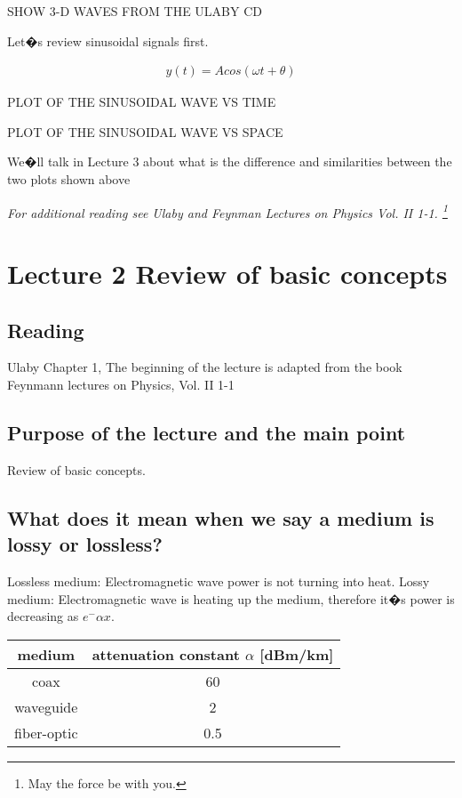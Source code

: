 SHOW 3-D WAVES FROM THE ULABY CD

Let�s review sinusoidal signals first.

\begin{eqnarray}
y(t)= A cos(\omega t + \theta)
\end{eqnarray}

PLOT OF THE SINUSOIDAL WAVE VS TIME


PLOT OF THE SINUSOIDAL WAVE VS SPACE


We�ll talk in Lecture 3 about what is the difference and similarities between the two plots shown above




{\it For additional reading see Ulaby and Feynman Lectures on Physics Vol. II 1-1. \footnote{May the force be with you.}}

\newpage

\section{Lecture 2 Review of basic concepts}


\subsection{Reading}
Ulaby Chapter 1, The beginning of the lecture is adapted from the book Feynmann lectures on Physics, Vol. II 1-1

\subsection{Purpose of the lecture and the main point}

Review of basic concepts.


\subsection{What does it mean when we say a medium is lossy or lossless?}
Lossless medium: Electromagnetic wave power is not turning into heat. Lossy medium: Electromagnetic wave is heating up the medium, therefore it�s power is decreasing as $e^-\alpha x$.




\begin{center}
\begin{tabular}{|c|c|} \hline
medium     & attenuation constant $\alpha$ [dBm/km]     \\  \hline       
coax        & 60                                 \\ \hline
 waveguide  & 2  \\ \hline          
fiber-optic &  0.5  \\ \hline
\end{tabular}
\end{center}


